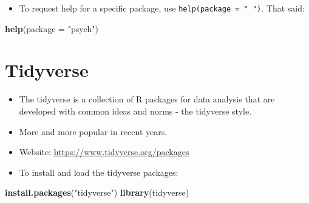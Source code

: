 \documentclass[
]{book}
\newenvironment{Shaded}{\begin{snugshade}}{\end{snugshade}}
\newcommand{\AttributeTok}[1]{\textcolor[rgb]{0.13,0.29,0.53}{#1}}
\newcommand{\FunctionTok}[1]{\textcolor[rgb]{0.13,0.29,0.53}{\textbf{#1}}}
\newcommand{\NormalTok}[1]{#1}
\newcommand{\StringTok}[1]{\textcolor[rgb]{0.31,0.60,0.02}{#1}}
\providecommand{\tightlist}{%
  \setlength{\itemsep}{0pt}\setlength{\parskip}{0pt}}
\begin{document}
\begin{itemize}
\tightlist
\item
  To request help for a specific package, use \texttt{help(package\ =\ "\ ")}. That said:
\end{itemize}

\begin{Shaded}
\begin{Highlighting}[]
\FunctionTok{help}\NormalTok{(}\AttributeTok{package =} \StringTok{"psych"}\NormalTok{)}
\end{Highlighting}
\end{Shaded}

\section{Tidyverse}\label{tidyverse}

\begin{itemize}
\tightlist
\item
  The tidyverse is a collection of R packages for data analysis that are developed with common ideas and norms - the tidyverse style.
\item
  More and more popular in recent years.
\item
  Website: \url{https://www.tidyverse.org/packages}
\item
  To install and load the tidyverse packages:
\end{itemize}

\begin{Shaded}
\begin{Highlighting}[]
\FunctionTok{install.packages}\NormalTok{(}\StringTok{"tidyverse"}\NormalTok{)}
\FunctionTok{library}\NormalTok{(tidyverse)}
\end{Highlighting}
\end{Shaded}
\end{document}
